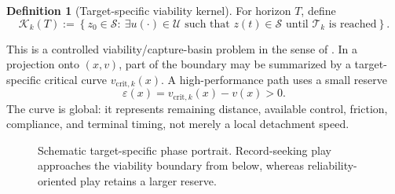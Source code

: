 \documentclass[11pt]{article}
\numberwithin{equation}{section}
\theoremstyle{definition}
\newtheorem{definition}[proposition]{Definition}
\theoremstyle{remark}
\newcommand{\safe}{\mathcal{S}}
\newcommand{\target}{\mathcal{T}}
\newcommand{\controls}{\mathcal{U}}
\newcommand{\K}{\mathcal{K}}
\begin{document}
\begin{definition}[Target-specific viability kernel]
For horizon $T$, define
\begin{equation}
  \K_k(T)
  :=\left\{z_0\in\safe:\ \exists u(\cdot)\in\controls
  \text{ such that }z(t)\in\safe\text{ until }\target_k\text{ is reached}\right\}.
  \label{eq:viability}
\end{equation}
\end{definition}

This is a controlled viability/capture-basin problem in the sense of \citet{Aubin1991,SaintPierre1994}.  In a projection onto $(x,v)$, part of the boundary may be summarized by a target-specific critical curve $v_{\mathrm{crit},k}(x)$.  A high-performance path uses a small reserve
\begin{equation}
  \varepsilon(x)=v_{\mathrm{crit},k}(x)-v(x)>0.
  \label{eq:reserve}
\end{equation}
The curve is global: it represents remaining distance, available control, friction, compliance, and terminal timing, not merely a local detachment speed.

\begin{figure}[t]
\centering
{}
\caption{Schematic target-specific phase portrait.  Record-seeking play approaches the viability boundary from below, whereas reliability-oriented play retains a larger reserve.}
\label{fig:phaseportrait}
\end{figure}
\end{document}
